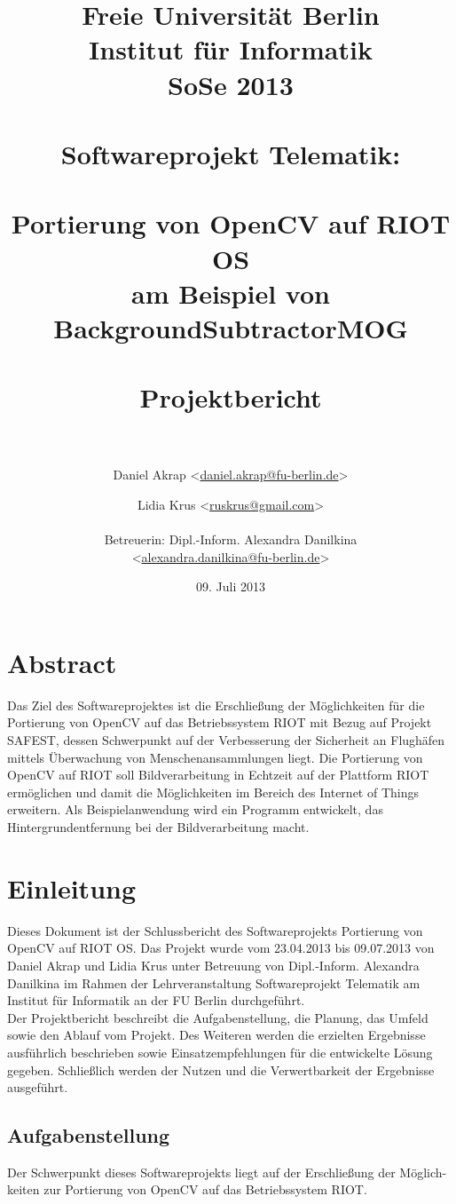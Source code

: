 \documentclass[10pt,a4paper]{article}
\title{Freie Universität Berlin \\
	Institut für Informatik \\
	SoSe 2013 \\ \ \\
	Softwareprojekt Telematik: \\ \ \\
	\textbf {Portierung von OpenCV auf RIOT OS} \\
	\textbf {am Beispiel von BackgroundSubtractorMOG} \\ \ \\
	Projektbericht \\ \ \\}
\author{Daniel Akrap  \textless\href{mailto:daniel.akrap@fu-berlin.de}{daniel.akrap@fu-berlin.de}\textgreater
        \and Lidia Krus \textless\href{mailto:ruskrus@gmail.com}{ruskrus@gmail.com}\textgreater 		\\ \\
	Betreuerin: Dipl.-Inform. Alexandra Danilkina \\ 
	\textless\href{mailto:alexandra.danilkina@fu-berlin.de}{alexandra.danilkina@fu-berlin.de}\textgreater}
\date{09. Juli 2013}
\begin{document}
\maketitle

\newpage
\section*{Abstract}

Das Ziel des Softwareprojektes ist die Erschließung der Möglichkeiten für die Portierung von OpenCV auf das Betriebssystem RIOT mit Bezug auf Projekt SAFEST, dessen Schwerpunkt auf der Verbesserung der Sicherheit an Flughäfen mittels Überwachung von Menschenansammlungen liegt. Die Portierung von OpenCV auf RIOT soll Bildverarbeitung in Echtzeit auf der Plattform RIOT ermöglichen und damit die Möglichkeiten im Bereich des Internet of Things erweitern. Als Beispielanwendung wird ein Programm entwickelt, das Hintergrundentfernung bei der Bildverarbeitung macht.

\newpage
\tableofcontents
\setcounter{tocdepth}{3}

\newpage
\section{Einleitung}

Dieses Dokument ist der Schlussbericht des Softwareprojekts \glqq Portierung von OpenCV auf RIOT OS\grqq. Das Projekt wurde vom 23.04.2013 bis 09.07.2013 von Daniel Akrap und Lidia Krus unter Betreuung von Dipl.-Inform. Alexandra Danilkina im Rahmen der Lehrveranstaltung Softwareprojekt Telematik am Institut für Informatik an der FU Berlin durchgeführt. \\

Der Projektbericht beschreibt die Aufgabenstellung, die Planung, das Umfeld sowie den Ablauf vom Projekt. Des Weiteren werden die erzielten Ergebnisse ausführlich beschrieben sowie Einsatzempfehlungen für die entwickelte Lösung gegeben. Schließlich werden der Nutzen und die Verwertbarkeit der Ergebnisse ausgeführt.

\subsection{Aufgabenstellung}

Der Schwerpunkt dieses Softwareprojekts liegt auf der Erschließung der Möglich-keiten zur Portierung von OpenCV auf das Betriebssystem RIOT. \\
\end{document}
